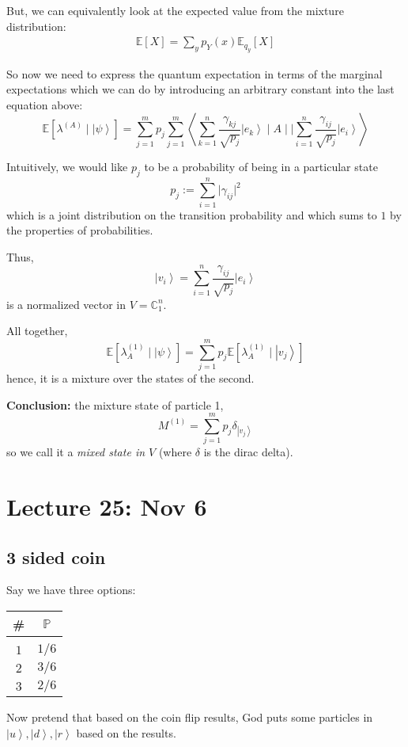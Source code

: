 \documentclass[12pt]{article}
\renewcommand{\P}{\mathbb{P}}
\newcommand{\brak}[1]{\left\langle #1 \right\rangle}
\newcommand{\C}{\mathbb{C}}
\newcommand{\ket}[1]{\left\vert #1 \right\rangle}
\newcommand{\E}{\mathbb{E}}
\begin{document}
        But, we can equivalently look at the expected value from the mixture distribution:
        \begin{align*}
            \E[X] = \sum_y p_Y(x) \E_{q_y}[X]
        \end{align*}

        So now we need to express the quantum expectation in terms of the marginal expectations which we can do by introducing an arbitrary constant into the last equation above:
        \[\E[\lambda^{(A)} \; | \; \ket{\psi}] = \sum_{j=1}^m p_j  \sum_{j=1}^m \brak{\sum_{k=1}^n \frac{ \gamma_{kj}}{\sqrt{p_j}} \ket{e_k} \; \bigg\vert \; A \; | \; \bigg\vert \sum_{i=1}^n \frac{\gamma_{ij}}{\sqrt{p_j}} \ket{e_i}}\]
        
        Intuitively, we would like $p_j$ to be a probability of being in a particular state 
        \[p_j := \sum_{i=1}^n \big\vert \gamma_{ij}\big\vert^2\] 
        which is a joint distribution on the transition probability and which sums to $1$ by the properties of probabilities. 

        Thus, 
        \[\ket{v_i} = \sum_{i=1}^n \frac{\gamma_{ij}}{\sqrt{p_j}} \ket{e_i}\]
        is a normalized vector in $V = \C^n_1$.

        All together, 
        \[\E[\lambda_A^{(1)} \; | \; \ket{\psi}] = \sum_{j=1}^m p_j \E[\lambda_A^{(1)} \; | \; \ket{v_j}]\]
        hence, it is a mixture over the states of the second.

        \textbf{Conclusion:} the mixture state of particle 1, 
        \[M^{(1)} = \sum_{j=1}^m p_j \delta_{\ket{v_j}}\]
        so we call it a \emph{mixed state in $V$} (where $\delta$ is the dirac delta).

\section*{Lecture 25: Nov 6}
    \subsection*{3 sided coin}
        Say we have three options:
        \begin{center}
            \begin{tabular*}{2in}{|c|c|} 
                \# & $\P$\\
                \hline\\
                $1$ & $1/6$\\
                $2$ & $3/6$\\
                $3$ & $2/6$\\
                \hline                
            \end{tabular*}
            Now pretend that based on the coin flip results, God puts some particles in $\ket{u}, \ket{d}, \ket{r}$ based on the results. 
        \end{center}
\end{document}
